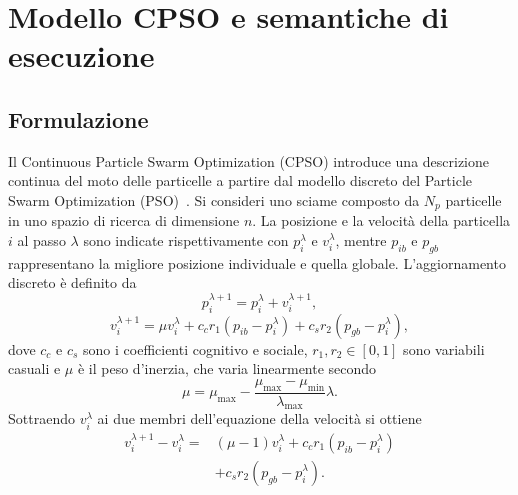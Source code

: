 \section{Modello CPSO e semantiche di esecuzione}
\label{sec:model}

\subsection{Formulazione}
\label{subsec:cpso-original-formulation}

Il Continuous Particle Swarm Optimization (CPSO) introduce una descrizione continua del moto delle particelle a partire dal modello discreto del Particle Swarm Optimization (PSO)~\citep{orlando2020analytic}. Si consideri uno sciame composto da $N_p$ particelle in uno spazio di ricerca di dimensione $n$. La posizione e la velocit\`a della particella $i$ al passo $\lambda$ sono indicate rispettivamente con $p_i^\lambda$ e $v_i^\lambda$, mentre $p_{ib}$ e $p_{gb}$ rappresentano la migliore posizione individuale e quella globale. L'aggiornamento discreto \`e definito da
\begin{equation}
 p_i^{\lambda+1}=p_i^\lambda+v_i^{\lambda+1},
 \label{eq:or-discrete-position}
\end{equation}
\begin{equation}
 v_i^{\lambda+1}=\mu v_i^\lambda
 +c_c r_1(p_{ib}-p_i^\lambda)
 +c_s r_2(p_{gb}-p_i^\lambda),
 \label{eq:or-discrete-velocity}
\end{equation}
dove $c_c$ e $c_s$ sono i coefficienti cognitivo e sociale, $r_1,r_2\in[0,1]$ sono variabili casuali e $\mu$ \`e il peso d'inerzia, che varia linearmente secondo
\begin{equation}
 \mu=\mu_{\max}-\frac{\mu_{\max}-\mu_{\min}}{\lambda_{\max}}\lambda.
 \label{eq:or-inertia}
\end{equation}
Sottraendo $v_i^\lambda$ ai due membri dell'equazione della velocit\`a si ottiene
\begin{equation}
\begin{aligned}
 v_i^{\lambda+1}-v_i^\lambda
 ={}&(\mu-1)v_i^\lambda+c_c r_1(p_{ib}-p_i^\lambda)\\
 &+c_s r_2(p_{gb}-p_i^\lambda).
\end{aligned}
\label{eq:or-velocity-difference}
\end{equation}

